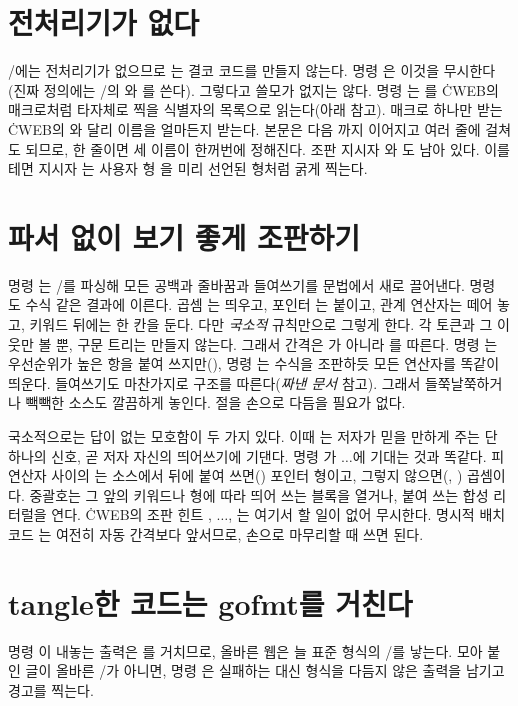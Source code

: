 \section{전처리기가 없다}
\GO/에는 전처리기가 없으므로 는 결코 코드를 만들지 않는다. 명령
은 이것을 무시한다(진짜 정의에는 \GO/의 와 를
쓴다). 그렇다고 쓸모가 없지는 않다. 명령 는 를 \.{CWEB}의
매크로처럼 타자체로 찍을 식별자의 목록으로 읽는다(아래 참고). 매크로 하나만
받는 \.{CWEB}의 와 달리 이름을 얼마든지 받는다. 본문은 다음 까지
이어지고 여러 줄에 걸쳐도 되므로,  한 줄이면 세 이름이
한꺼번에 정해진다. 조판 지시자 와 도 남아 있다. 이를테면
지시자 는 사용자 형 을 미리 선언된 형처럼 굵게 찍는다.

\section{파서 없이 보기 좋게 조판하기}
명령 는 \CEE/를 파싱해 모든 공백과 줄바꿈과 들여쓰기를 문법에서
새로 끌어낸다. 명령 도 수식 같은 결과에 이른다. 곱셈
는 띄우고, 포인터 는 붙이고, 관계 연산자는 떼어 놓고,
키워드 뒤에는 한 칸을 둔다. 다만 {\it 국소적\/} 규칙만으로 그렇게 한다. 각
토큰과 그 이웃만 볼 뿐, 구문 트리는 만들지 않는다. 그래서 간격은
가 아니라 를 따른다. 명령 는 우선순위가 높은
항을 붙여 쓰지만(), 명령 는 수식을 조판하듯 모든
연산자를 똑같이 띄운다. 들여쓰기도 마찬가지로 구조를 따른다({\it 짜낸
문서\/} 참고). 그래서 들쭉날쭉하거나 빽빽한 소스도 깔끔하게 놓인다. 절을
손으로 다듬을 필요가 없다.

국소적으로는 답이 없는 모호함이 두 가지 있다. 이때 는 저자가
믿을 만하게 주는 단 하나의 신호, 곧 저자 자신의 띄어쓰기에 기댄다.
명령 가 \cw{@[}\thinspace$\ldots$\thinspace\cw{@]}에 기대는 것과 똑같다.
피연산자 사이의 \cw{*}는 소스에서 뒤에 붙여 쓰면() 포인터 형이고,
그렇지 않으면(, ) 곱셈이다. 중괄호는 그 앞의 키워드나 형에
따라 띄어 쓰는 블록을 열거나, 붙여 쓰는 합성 리터럴을 연다. \.{CWEB}의
조판 힌트 , \cw{@[}\thinspace$\ldots$\thinspace\cw{@]}, 는 여기서
할 일이 없어 무시한다. 명시적 배치 코드    는
여전히 자동 간격보다 앞서므로, 손으로 마무리할 때 쓰면 된다.

\section{tangle한 코드는 gofmt를 거친다}
명령 이 내놓는 출력은 를 거치므로, 올바른 웹은 늘 표준 형식의 \GO/를
낳는다. 모아 붙인 글이 올바른 \GO/가 아니면, 명령 은 실패하는
대신 형식을 다듬지 않은 출력을 남기고 경고를 찍는다.


